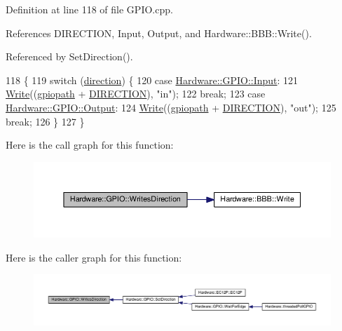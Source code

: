 Definition at line 118 of file G\+P\+I\+O.\+cpp.



References D\+I\+R\+E\+C\+T\+I\+O\+N, Input, Output, and Hardware\+::\+B\+B\+B\+::\+Write().



Referenced by Set\+Direction().


\begin{DoxyCode}
118                                                                       \{
119   \textcolor{keywordflow}{switch} (\hyperlink{class_hardware_1_1_g_p_i_o_a77e93e4f6650507fdc4898d272d540e7}{direction}) \{
120   \textcolor{keywordflow}{case} \hyperlink{class_hardware_1_1_g_p_i_o_a7507431d6341c146f22dcdb21b78ffd4a5614339496b61db558bd9a26a327088e}{Hardware::GPIO::Input}:
121     \hyperlink{class_hardware_1_1_b_b_b_a155cc06f76d82a6b690ce5ea08e7c68e}{Write}((\hyperlink{class_hardware_1_1_g_p_i_o_ac47062ed6aba52b9e8506e1575bf5061}{gpiopath} + \hyperlink{_g_p_i_o_8h_a1d692daf1ffadae2243a5ab556589629}{DIRECTION}), \textcolor{stringliteral}{"in"});
122     \textcolor{keywordflow}{break};
123   \textcolor{keywordflow}{case} \hyperlink{class_hardware_1_1_g_p_i_o_a7507431d6341c146f22dcdb21b78ffd4a72432a9b39a6e45297b1158da8bb60eb}{Hardware::GPIO::Output}:
124     \hyperlink{class_hardware_1_1_b_b_b_a155cc06f76d82a6b690ce5ea08e7c68e}{Write}((\hyperlink{class_hardware_1_1_g_p_i_o_ac47062ed6aba52b9e8506e1575bf5061}{gpiopath} + \hyperlink{_g_p_i_o_8h_a1d692daf1ffadae2243a5ab556589629}{DIRECTION}), \textcolor{stringliteral}{"out"});
125     \textcolor{keywordflow}{break};
126   \}
127 \}
\end{DoxyCode}


Here is the call graph for this function\+:\nopagebreak
\begin{figure}[H]
\begin{center}
\leavevmode
\includegraphics[width=350pt]{class_hardware_1_1_g_p_i_o_a73426139a22b7e489a9c402678a477e4_cgraph}
\end{center}
\end{figure}




Here is the caller graph for this function\+:\nopagebreak
\begin{figure}[H]
\begin{center}
\leavevmode
\includegraphics[width=350pt]{class_hardware_1_1_g_p_i_o_a73426139a22b7e489a9c402678a477e4_icgraph}
\end{center}
\end{figure}


